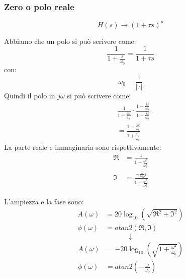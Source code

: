 \documentclass[a4paper]{article}
\begin{document}
\subsubsection{Zero o polo reale}
\[
  H(s) \to \left( 1 + \tau s \right)^{\mu}
\]
\begin{figure}[H]
  \centering
\end{figure}
Abbiamo che un polo si può scrivere come:
\[
\frac{1}{1 + \frac{s}{\omega_0}} = \frac{1}{1 + \tau s}
\] 
con:
\[
\omega_0 = \frac{1}{|\tau|}
\] 
Quindi il polo in \( j \omega \) si può scrivere come:
\[
  \begin{aligned}
    &\frac{1}{1 + \frac{j \omega}{w_0}}\cdot \frac{1 - \frac{j \omega}{\omega_0}}{1 - \frac{j \omega}{\omega_0}}\\
    &= \frac{1 - \frac{j \omega}{\omega_0}}{1 + \frac{\omega^2}{\omega_0^2}}
  \end{aligned}
\] 
La parte reale e immaginaria sono rispettivamente:
\[
\begin{aligned}
  \Re &= \frac{1}{1 + \frac{\omega^2}{\omega_0^2}}\\
  \Im &= \frac{-\frac{\omega}{\omega_0}j}{1 + \frac{\omega^2}{\omega_0^2}}
\end{aligned}
\] 

\begin{definition}
  L'ampiezza e la fase sono:
  \[
    \begin{aligned}
      A(\omega) &= 20 \log_{10} \left( \sqrt{\Re^2 + \Im^2} \right)\\
      \phi(\omega) &= atan2\left( \Re, \Im \right)
    \end{aligned}
  \] 
  \[
    \downarrow
  \] 
  \[
    \begin{aligned}
      A(\omega) &= -20 \log_{10} \left( \sqrt{1 + \frac{\omega^2}{\omega_0}} \right)\\
      \phi(\omega) &= atan2\left( -\frac{\omega}{\omega_0} \right)
    \end{aligned}
  \] 
\end{definition}
\end{document}
